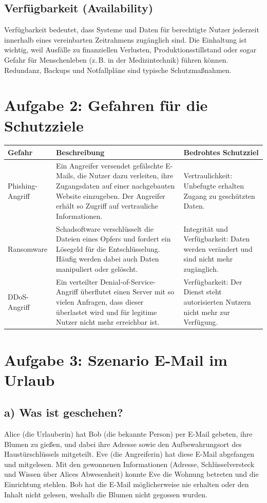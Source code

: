 \documentclass[
	fontsize=12pt,          %
	paper=a4,               %
	numbers=noenddot,       %
	listof=totoc,           %
	listof=entryprefix,     %
	listof=nochaptergap,    %
	bibliography=totoc,     %
	parskip=half,           %
	openany                 %
]{scrbook}
\begin{document}
\section*{Verfügbarkeit (Availability)}
Verfügbarkeit bedeutet, dass Systeme und Daten für berechtigte Nutzer jederzeit innerhalb eines vereinbarten Zeitrahmens zugänglich sind.
Die Einhaltung ist wichtig, weil Ausfälle zu finanziellen Verlusten, Produktionsstillstand oder sogar Gefahr für Menschenleben (z.\,B. in der Medizintechnik) führen können.
Redundanz, Backups und Notfallpläne sind typische Schutzmaßnahmen.


\chapter*{Aufgabe 2: Gefahren für die Schutzziele}

\begin{tabularx}{\textwidth}{@{} l X X @{}}
	\toprule
	Gefahr & Beschreibung & Bedrohtes Schutzziel \\
	\midrule
	Phishing-Angriff &
	Ein Angreifer versendet gefälschte E-Mails, die Nutzer dazu verleiten, ihre Zugangsdaten auf einer nachgebauten Website einzugeben.
	Der Angreifer erhält so Zugriff auf vertrauliche Informationen. &
	Vertraulichkeit: Unbefugte erhalten Zugang zu geschützten Daten. \\[6pt]

	Ransomware &
	Schadsoftware verschlüsselt die Dateien eines Opfers und fordert ein Lösegeld für die Entschlüsselung.
	Häufig werden dabei auch Daten manipuliert oder gelöscht. &
	Integrität und Verfügbarkeit: Daten werden verändert und sind nicht mehr zugänglich. \\[6pt]

	DDoS-Angriff &
	Ein verteilter Denial-of-Service-Angriff überflutet einen Server mit so vielen Anfragen, dass dieser überlastet wird und für legitime Nutzer nicht mehr erreichbar ist. &
	Verfügbarkeit: Der Dienst steht autorisierten Nutzern nicht mehr zur Verfügung. \\
	\bottomrule
\end{tabularx}


\chapter*{Aufgabe 3: Szenario E-Mail im Urlaub}

\section*{a) Was ist geschehen?}
Alice (die Urlauberin) hat Bob (die bekannte Person) per E-Mail gebeten, ihre Blumen zu gießen, und dabei ihre Adresse sowie den Aufbewahrungsort des Haustürschlüssels mitgeteilt.
Eve (die Angreiferin) hat diese E-Mail abgefangen und mitgelesen.
Mit den gewonnenen Informationen (Adresse, Schlüsselversteck und Wissen über Alices Abwesenheit) konnte Eve die Wohnung betreten und die Einrichtung stehlen.
Bob hat die E-Mail möglicherweise nie erhalten oder den Inhalt nicht gelesen, weshalb die Blumen nicht gegossen wurden.
\end{document}
